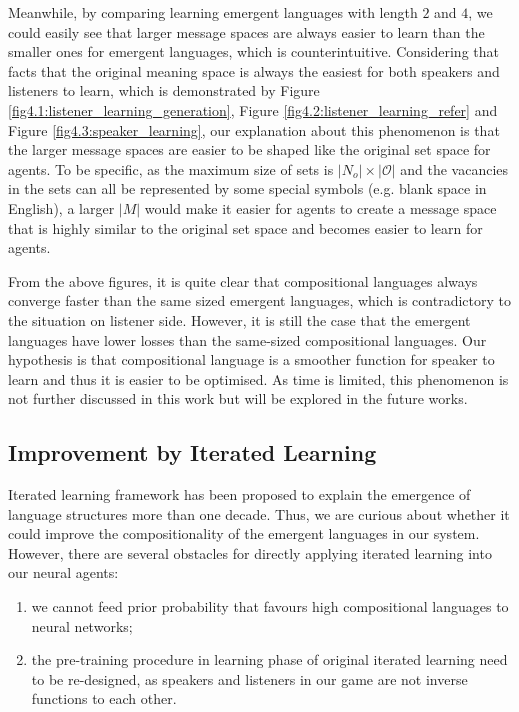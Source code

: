 Meanwhile, by comparing learning emergent languages with length $2$ and $4$, we could easily see that larger message spaces are always easier to learn than the smaller ones for emergent languages, which is counterintuitive. Considering that facts that the original meaning space is always the easiest for both speakers and listeners to learn, which is demonstrated by Figure \ref{fig4.1:listener_learning_generation}, Figure \ref{fig4.2:listener_learning_refer} and Figure \ref{fig4.3:speaker_learning}, our explanation about this phenomenon is that the larger message spaces are easier to be shaped like the original set space for agents. To be specific, as the maximum size of sets is  $|N_o|\times |\mathcal{O}|$ and the vacancies in the sets can all be represented by some special symbols (e.g. blank space in English), a larger $|M|$ would make it easier for agents to create a message space that is highly similar to the original set space and becomes easier to learn for agents.

From the above figures, it is quite clear that compositional languages always converge faster than the same sized emergent languages, which is contradictory to the situation on listener side. However, it is still the case that the emergent languages have lower losses than the same-sized compositional languages. Our hypothesis is that compositional language is a smoother function for speaker to learn and thus it is easier to be optimised. As time is limited, this phenomenon is not further discussed in this work but will be explored in the future works.

\subsection{Improvement by Iterated Learning}
\label{ssec4.3.:iterated_learning_improve}

Iterated learning framework \cite{kirby2002emergence} has been proposed to explain the emergence of language structures more than one decade. Thus, we are curious about whether it could improve the compositionality of the emergent languages in our system. However, there are several obstacles for directly applying iterated learning into our neural agents:

\begin{enumerate}
    \item we cannot feed prior probability that favours high compositional languages to neural networks;
    \item the pre-training procedure in learning phase of original iterated learning need to be re-designed, as speakers and listeners in our game are not inverse functions to each other.
\end{enumerate}

